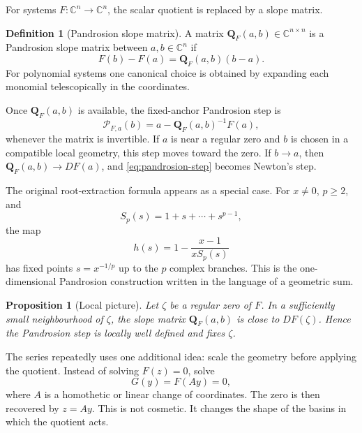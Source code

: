 \documentclass[11pt,a4paper]{article}
\theoremstyle{soft}
\newtheorem{proposition}[theorem]{Proposition}
\theoremstyle{definition}
\newtheorem{definition}[theorem]{Definition}
\newcommand{\C}{\mathbb C}
\newcommand{\Q}{\mathbf Q}
\begin{document}
For systems \(F:\C^n\to\C^n\), the scalar quotient is replaced by a slope matrix.

\begin{definition}[Pandrosion slope matrix]
A matrix \(\Q_F(a,b)\in\C^{n\times n}\) is a Pandrosion slope matrix between \(a,b\in\C^n\) if
\begin{equation}\label{eq:matrix-Q}
   F(b)-F(a)=\Q_F(a,b)(b-a).
\end{equation}
For polynomial systems one canonical choice is obtained by expanding each monomial telescopically in the coordinates.
\end{definition}

Once \(\Q_F(a,b)\) is available, the fixed-anchor Pandrosion step is
\begin{equation}\label{eq:pandrosion-step}
   \mathcal P_{F,a}(b)=a-\Q_F(a,b)^{-1}F(a),
\end{equation}
whenever the matrix is invertible.  If \(a\) is near a regular zero and \(b\) is chosen in a compatible local geometry, this step moves toward the zero.  If \(b\to a\), then \(\Q_F(a,b)\to DF(a)\), and \eqref{eq:pandrosion-step} becomes Newton's step.

The original root-extraction formula appears as a special case.  For \(x\neq0\), \(p\ge2\), and
\[
   S_p(s)=1+s+\cdots+s^{p-1},
\]
the map
\begin{equation}\label{eq:root-map}
   h(s)=1-\frac{x-1}{xS_p(s)}
\end{equation}
has fixed points \(s=x^{-1/p}\) up to the \(p\) complex branches.  This is the one-dimensional Pandrosion construction written in the language of a geometric sum.

\begin{proposition}[Local picture]
Let \(\zeta\) be a regular zero of \(F\).  In a sufficiently small neighbourhood of \(\zeta\), the slope matrix \(\Q_F(a,b)\) is close to \(DF(\zeta)\).  Hence the Pandrosion step is locally well defined and fixes \(\zeta\).
\end{proposition}

The series repeatedly uses one additional idea: scale the geometry before applying the quotient.  Instead of solving \(F(z)=0\), solve
\begin{equation}\label{eq:scaled-system}
   G(y)=F(Ay)=0,
\end{equation}
where \(A\) is a homothetic or linear change of coordinates.  The zero is then recovered by \(z=Ay\).  This is not cosmetic.  It changes the shape of the basins in which the quotient acts.
\end{document}

